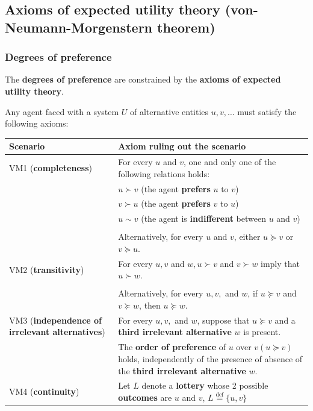 \documentclass[11pt]{article}
\newcommand{\defequal}{\stackrel{\scriptscriptstyle\mathrm{def}}{=}}
\begin{document}
\subsection{Axioms of expected utility theory (von-Neumann-Morgenstern theorem)}
\label{sec:org88c28da}

\subsubsection{Degrees of preference}
\label{sec:org7dc5e3b}
The \textbf{degrees of preference} are constrained by the \textbf{axioms of expected utility theory}.

Any agent faced with a system \(U\) of alternative entities \(u, v, \ldots\) must satisfy the following axioms:
\begin{center}
\begin{tabular}{|m{7em}|m{25em}|}
\hline
Scenario & Axiom ruling out the scenario\\
\hline
VM1 (\textbf{completeness}) & For every \(u\) and \(v\), one and only one of the following relations holds:\\
 & \(u \succ v\) (the agent \textbf{prefers} \(u\) to \(v\))\\
 & \(v \succ u\) (the agent \textbf{prefers} \(v\) to \(u\))\\
 & \(u \sim v\) (the agent is \textbf{indifferent} between \(u\) and \(v\))\\
 & \\
 & Alternatively, for every \(u\) and \(v\), either \(u \succeq v\) or \(v \succeq u\).\\
\hline
VM2 (\textbf{transitivity}) & For every \(u, v\) and \(w, u \succ v\) and \(v \succ w\) imply that \(u \succ w\).\\
 & \\
 & Alternatively, for every \(u, v,\) and \(w\), if \(u \succeq v\) and \(v \succeq w\), then \(u \succeq w\).\\
\hline
VM3 (\textbf{independence of irrelevant alternatives}) & For every \(u, v,\) and \(w\), suppose that \(u \succeq v\) and a \textbf{third irrelevant alternative} \(w\) is present.\\
 & The \textbf{order of preference} of \(u\) over \(v (u \succeq v)\) holds, independently of the presence of absence of the \textbf{third irrelevant alternative} \(w\).\\
\hline
VM4 (\textbf{continuity}) & Let \(L\) denote a \textbf{lottery} whose 2 possible \textbf{outcomes} are \(u\) and \(v\), \(L \defequal \{u, v\}\)\\

\end{tabular}
\end{center}
\end{document}
